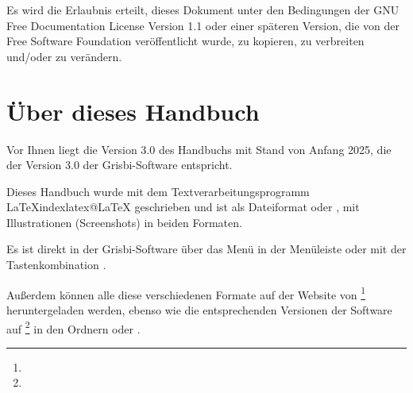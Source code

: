 Es wird die Erlaubnis erteilt, dieses Dokument unter den Bedingungen der GNU Free Documentation License Version 1.1 oder einer späteren Version, die von der \gls{Free Software Foundation} veröffentlicht wurde, zu kopieren, zu verbreiten und/oder zu verändern.

\section{Über dieses Handbuch\label{introduction-manual}}


Vor Ihnen liegt die Version 3.0 des Handbuchs mit Stand von \actuality{}Anfang 2025, die der Version 3.0 der Grisbi-Software entspricht.




Dieses Handbuch wurde mit dem Textverarbeitungsprogramm \gls{LaTeX}index{latex@LaTeX} geschrieben und ist als \gls{Dateiformat}  oder , mit Illustrationen (Screenshots) in beiden Formaten.

Es ist direkt in der Grisbi-Software über das Menü  in der Menüleiste oder mit der Tastenkombination .

Außerdem können alle diese verschiedenen Formate auf der Website von \footnote{\urlSourceForgeDocumentation{}} heruntergeladen werden, ebenso wie die entsprechenden Versionen der Software auf \footnote{\urlSourceForge{}} in den Ordnern  oder .

